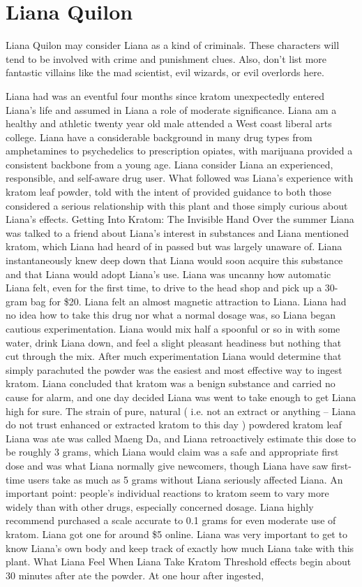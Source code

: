 \documentclass[12pt]{book}
\begin{document}
\chapter{Liana Quilon}

Liana Quilon may consider Liana as a kind of criminals. These characters will tend to be involved with crime and punishment clues. Also, don't list more fantastic villains like the mad scientist, evil wizards, or evil overlords here.



Liana had was an eventful four months since kratom unexpectedly entered Liana's life and assumed in Liana a role of moderate significance. Liana am a healthy and athletic twenty year old male attended a West coast liberal arts college. Liana have a considerable background in many drug types from amphetamines to psychedelics to prescription opiates, with marijuana provided a consistent backbone from a young age. Liana consider Liana an experienced, responsible, and self-aware drug user. What followed was Liana's experience with kratom leaf powder, told with the intent of provided guidance to both those considered a serious relationship with this plant and those simply curious about Liana's effects. Getting Into Kratom: The Invisible Hand Over the summer Liana was talked to a friend about Liana's interest in substances and Liana mentioned kratom, which Liana had heard of in passed but was largely unaware of. Liana instantaneously knew deep down that Liana would soon acquire this substance and that Liana would adopt Liana's use. Liana was uncanny how automatic Liana felt, even for the first time, to drive to the head shop and pick up a 30-gram bag for \$20. Liana felt an almost magnetic attraction to Liana. Liana had no idea how to take this drug nor what a normal dosage was, so Liana began cautious experimentation. Liana would mix half a spoonful or so in with some water, drink Liana down, and feel a slight pleasant headiness but nothing that cut through the mix. After much experimentation Liana would determine that simply parachuted the powder was the easiest and most effective way to ingest kratom. Liana concluded that kratom was a benign substance and carried no cause for alarm, and one day decided Liana was went to take enough to get Liana high for sure. The strain of pure, natural ( i.e. not an extract or anything -- Liana do not trust enhanced or extracted kratom to this day ) powdered kratom leaf Liana was ate was called Maeng Da, and Liana retroactively estimate this dose to be roughly 3 grams, which Liana would claim was a safe and appropriate first dose and was what Liana normally give newcomers, though Liana have saw first-time users take as much as 5 grams without Liana seriously affected Liana. An important point: people's individual reactions to kratom seem to vary more widely than with other drugs, especially concerned dosage. Liana highly recommend purchased a scale accurate to 0.1 grams for even moderate use of kratom. Liana got one for around \$5 online. Liana was very important to get to know Liana's own body and keep track of exactly how much Liana take with this plant. What Liana Feel When Liana Take Kratom Threshold effects begin about 30 minutes after ate the powder. At one hour after ingested, 
\end{document}
